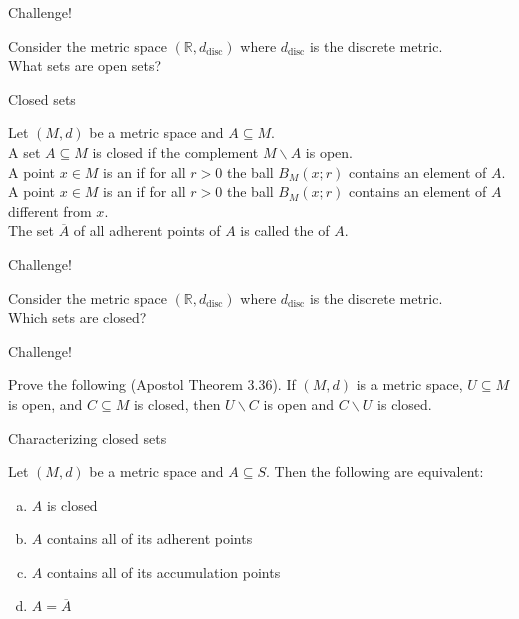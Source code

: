\documentclass{beamer}
\begin{document}
\begin{frame}{Challenge!}
\begin{prob}
Consider the metric space $(\mathbb{R},d_{\text{disc}})$ where $d_{\text{disc}}$ is the discrete metric.\\
What sets are open sets?
\end{prob}
\end{frame}

\begin{frame}{Closed sets}
\begin{defn}
\pause
Let $(M,d)$ be a metric space and $A\subseteq M$.\\
\pause
A set $A\subseteq M$ is closed if the complement $M\backslash A$ is open.\\
\pause
A point $ x\in M$ is an  if for all $r>0$ the ball $B_M( x; r)$ contains an element of $A$.\\
\pause
A point $ x\in M$ is an  if for all $r>0$ the ball $B_M( x; r)$ contains an element of $A$ different from $x$.\\
\pause
The set $\overline A$ of all adherent points of $A$ is called the  of $A$.
\end{defn}
\end{frame}


\begin{frame}{Challenge!}
\begin{prob}
Consider the metric space $(\mathbb{R},d_{\text{disc}})$ where $d_{\text{disc}}$ is the discrete metric.\\
Which sets are closed?
\end{prob}
\end{frame}

\begin{frame}{Challenge!}
\begin{prob}
Prove the following (Apostol Theorem 3.36).
If $(M,d)$ is a metric space, $U\subseteq M$ is open, and $C\subseteq M$ is closed, then $U\backslash C$ is open and $C\backslash U$ is closed.
\end{prob}
\end{frame}

\begin{frame}{Characterizing closed sets}
\begin{thm}
Let $(M,d)$ be a metric space and $A\subseteq S$.  Then the following are equivalent:
\begin{enumerate}[(a)]
\pause
\item $A$ is closed
\pause
\item $A$ contains all of its adherent points
\pause
\item $A$ contains all of its accumulation points
\pause
\item $A=\overline{A}$
\end{enumerate}
\end{thm}
\end{frame}
\end{document}
